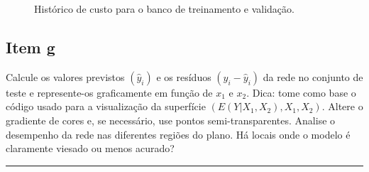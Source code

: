 \documentclass[
  a4paperpaper,
]{article}
\begin{document}
\begin{figure}[H]


\caption{\label{fig-historico-custo-treinamento-validacao}Histórico de
custo para o banco de treinamento e validação.}

\end{figure}%

\subsection{Item g}\label{item-g}

Calcule os valores previstos \((\hat{y}_i)\) e os resíduos
\((y_i − \hat{y}_i)\) da rede no conjunto de teste e represente-os
graficamente em função de \(x_1\) e \(x_2\). Dica: tome como base o
código usado para a visualização da superfície
\((E(Y |X_1, X_2), X_1, X_2)\). Altere o gradiente de cores e, se
necessário, use pontos semi-transparentes. Analise o desempenho da rede
nas diferentes regiões do plano. Há locais onde o modelo é claramente
viesado ou menos acurado?

\begin{center}\rule{0.5\linewidth}{0.5pt}\end{center}
\end{document}
